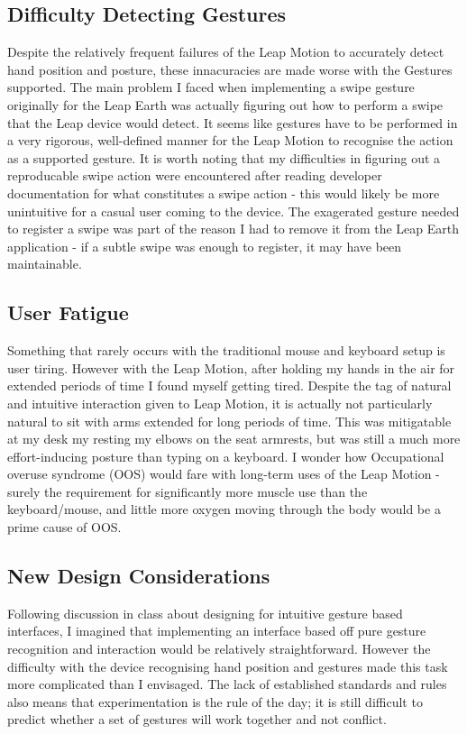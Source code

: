 \documentclass{sigplanconf}
\begin{document}
\subsection{Difficulty Detecting Gestures}

Despite the relatively frequent failures of the Leap Motion to accurately detect hand position and posture, these innacuracies are made worse with the Gestures supported. The main problem I faced when implementing a swipe gesture originally for the Leap Earth was actually figuring out how to perform a swipe that the Leap device would detect. It seems like gestures have to be performed in a very rigorous, well-defined manner for the Leap Motion to recognise the action as a supported gesture. It is worth noting that my difficulties in figuring out a reproducable swipe action were encountered after reading developer documentation for what constitutes a swipe action - this would likely be more unintuitive for a casual user coming to the device. The exagerated gesture needed to register a swipe was part of the reason I had to remove it from the Leap Earth application - if a subtle swipe was enough to register, it may have been maintainable.

\subsection{User Fatigue}

Something that rarely occurs with the traditional mouse and keyboard setup is user tiring. However with the Leap Motion, after holding my hands in the air for extended periods of time I found myself getting tired. Despite the tag of natural and intuitive interaction given to Leap Motion, it is actually not particularly natural to sit with arms extended for long periods of time. This was mitigatable at my desk my resting my elbows on the seat armrests, but was still a much more effort-inducing posture than typing on a keyboard. I wonder how Occupational overuse syndrome (OOS) would fare with long-term uses of the Leap Motion - surely the requirement for significantly more muscle use than the keyboard/mouse, and little more oxygen moving through the body would be a prime cause of OOS.

\subsection{New Design Considerations}

Following discussion in class about designing for intuitive gesture based interfaces, I imagined that implementing an interface based off pure gesture recognition and interaction would be relatively straightforward. However the difficulty with the device recognising hand position and gestures made this task more complicated than I envisaged. The lack of established standards and rules also means that experimentation is the rule of the day; it is still difficult to predict whether a set of gestures will work together and not conflict. 
\end{document}
